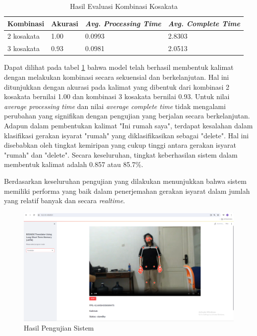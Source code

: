 \begin{table}[H]
  \caption{Hasil Evaluasi Kombinasi Kosakata}
  \label{tb:evaluasiKombinasi}
  \centering
  \begin{tabular}{llll}
    \hline
    \textbf{Kombinasi} & \textbf{Akurasi} & \emph{\textbf{Avg. Processing Time}} & \emph{\textbf{Avg. Complete Time}} \\
    \hline
    2 kosakata & 1.00 & 0.0993 & 2.8303 \\
    3 kosakata & 0.93 & 0.0981 & 2.0513 \\
    \hline
  \end{tabular}
\end{table}

Dapat dilihat pada tabel \ref{tb:evaluasiKombinasi} bahwa model telah berhasil membentuk kalimat dengan melakukan kombinasi secara sekuensial dan berkelanjutan. Hal ini ditunjukkan dengan akurasi pada kalimat yang dibentuk dari kombinasi 2 kosakata bernilai 1.00 dan kombinasi 3 kosakata bernilai 0.93. Untuk nilai \emph{average processing time} dan nilai \emph{average complete time} tidak mengalami perubahan yang signifikan dengan pengujian yang berjalan secara berkelanjutan. Adapun dalam pembentukan kalimat "Ini rumah saya", terdapat kesalahan dalam klasifikasi gerakan isyarat "rumah" yang diklasifikasikan sebagai "delete". Hal ini disebabkan oleh tingkat kemiripan yang cukup tinggi antara gerakan isyarat "rumah" dan "delete". Secara keseluruhan, tingkat keberhasilan sistem dalam membentuk kalimat adalah 0.857 atau 85.7\%.

Berdasarkan keseluruhan pengujian yang dilakukan menunjukkan bahwa sistem memiliki performa yang baik dalam penerjemahan gerakan isyarat dalam jumlah yang relatif banyak dan secara \emph{realtime}.

\begin{figure}[ht]
    \centering

    \includegraphics[scale=0.12]{gambar/bab3-layoutweb.png}
 
    \caption{Hasil Pengujian Sistem}
    \label{fig:layoutweb}
\end{figure}